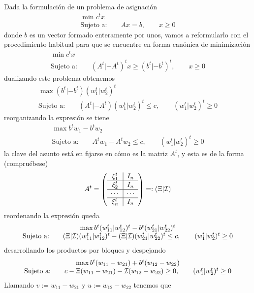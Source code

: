 Dada la formulación de un problema de asignación
\begin{equation*}
	\begin{array}{c}
		\min c^tx\\
		\text{Sujeto a:}\qquad Ax= b,\qquad x\geq 0
	\end{array}
\end{equation*}
donde $b$ es un vector formado enteramente por unos, vamos a reformularlo con el procedimiento habitual para que se encuentre en forma canónica de minimización
\begin{equation*}
	\begin{array}{c}
		\min c^tx\\
		\text{Sujeto a:}\qquad (A^t|-A^t)^tx\geq (b^t|-b^t)^t,\qquad x\geq 0
	\end{array}
\end{equation*}
dualizando este problema obtenemos
\begin{equation*}
	\begin{array}{c}
		\max (b^t|-b^t)(w_1^t|w_2^t)^t\\
		\text{Sujeto a:}\qquad (A^t|-A^t)(w_1^t|w_2^t)^t\leq c,\qquad (w_1^t|w_2^t)^t\geq 0
	\end{array}
\end{equation*}
reorganizando la expresión se tiene
\begin{equation*}
	\begin{array}{c}
		\max b^tw_1-b^tw_2\\
		\text{Sujeto a:}\qquad A^tw_1-A^tw_2\leq c,\qquad (w_1^t|w_2^t)^t\geq 0
	\end{array}
\end{equation*}
la clave del asunto está en fijarse en cómo es la matriz $A^t$, y esta es de la forma (compruébese)
\begin{equation*}
	A^t=\left(\begin{array}{c|c}
		\xi_1^t& I_n\\
		\hline
		\xi_2^t& I_n\\
		\hline
		\cdots&\cdots\\
		\hline
		\xi_n^t&I_n
	\end{array}\right)=:(\Xi|\mathcal{I})
\end{equation*}
reordenando la expresión queda
\begin{equation*}
	\begin{array}{c}
		\max b^t(w_{11}^t|w_{12}^t)^t-b^t(w_{21}^t|w_{22}^t)^t\\
		\text{Sujeto a:}\qquad (\Xi|\mathcal{I})(w_{11}^t|w_{12}^t)^t-(\Xi|\mathcal{I})(w_{21}^t|w_{22}^t)^t\leq c,\qquad (w_1^t|w_2^t)^t\geq 0
	\end{array}
\end{equation*}
desarrollando los productos por bloques y despejando
\begin{equation*}
	\begin{array}{c}
		\max b^t(w_{11}-w_{21})+b^t(w_{12}-w_{22})\\
		\text{Sujeto a:}\qquad c-\Xi(w_{11}-w_{21})-\mathcal{I}(w_{12}-w_{22})\geq 0,\qquad (w_1^t|w_2^t)^t\geq 0
	\end{array}
\end{equation*}
Llamando $v:=w_{11}-w_{21}$ y $u:=w_{12}-w_{22}$ tenemos que

